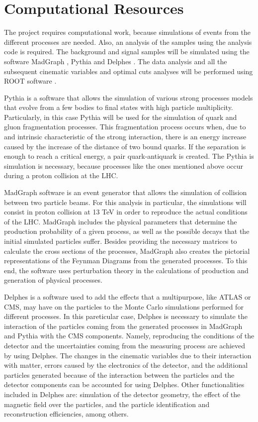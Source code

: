 \section{Computational Resources}

The project requires computational work, because simulations of events from the different processes are needed. Also, an analysis of the samples using the analysis code is required. The background and signal samples will be simulated using the software MadGraph \cite{MadGraph}, Pythia \cite{Pythia} and Delphes \cite{Delphes}. The data analysis and all the subsequent cinematic variables and optimal cuts analyses will be performed using ROOT software \cite{ROOT}.

Pythia is a software that allows the simulation of various strong processes models that evolve from a few bodies to final states with high particle multiplicity. Particularly, in this case Pythia will be used for the simulation of quark and gluon fragmentation processes. This fragmentation process occurs when, due to and intrinsic characteristic of the strong interaction, there is an energy increase caused by the increase of the distance of two bound quarks. If the separation is enough to reach a critical energy, a pair quark-antiquark is created. The Pythia is simulation is necessary, because processes like the ones mentioned above occur during a proton collision at the LHC.

MadGraph software is an event generator that allows the simulation of collision between two particle beams. For this analysis in particular, the simulations will consist in proton collision at 13 TeV in order to reproduce the actual conditions of the LHC. MadGraph includes the physical parameters that determine the production probability of a given process, as well as the possible decays that the initial simulated particles suffer. Besides providing the necessary matrices to calculate the cross sections of the processes, MadGraph also creates the pictorial representations of the Feynman Diagrams from the generated processes. To this end, the software uses perturbation theory in the calculations of production and generation of physical processes.

Delphes is a software used to add the effects that a multipurpose, like ATLAS or CMS, may have on the particles to the Monte Carlo simulations performed for different processes. In this pareticular case, Delphes is necessary to simulate the interaction of the particles coming from the generated processes in MadGraph and Pythia with the CMS components. Namely, reproducing the conditions of the detector and the uncertainties coming from the measuring process are achieved by using Delphes. The changes in the cinematic variables due to their interaction with matter, errors caused by the electronics of the detector, and the additional particles generated because of the interaction between the particles and the detector components can be accounted for using Delphes. Other functionalities included in Delphes are: simulation of the detector geometry, the effect of the magnetic field over the particles, and the particle identification and reconstruction efficiencies, among others.

